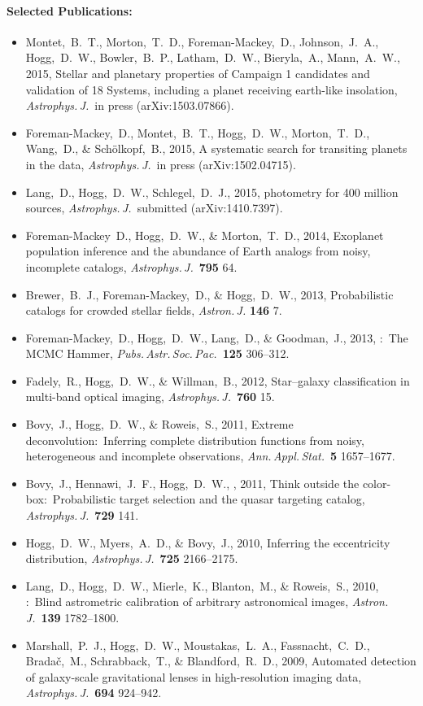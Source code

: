 \documentclass[12pt]{article}
\begin{document}
\paragraph{Selected Publications:}
\begin{itemize}\setlength{\itemsep}{0pt}
\item
Montet,~B.~T., Morton,~T.~D., Foreman-Mackey,~D., Johnson,~J.~A.,
Hogg,~D.~W., Bowler,~B.~P., Latham,~D.~W., Bieryla,~A., Mann,~A.~W., 2015,
{Stellar and planetary properties of  Campaign 1
  candidates and validation of 18 Systems, including a planet
  receiving earth-like insolation},
\textit{Astrophys.\,J.}\ in press (arXiv:1503.07866).
\item
Foreman-Mackey,~D., Montet,~B.~T., Hogg,~D.~W., Morton,~T.~D., Wang,~D., \& Sch\"olkopf,~B., 2015,
{A systematic search for transiting planets in the  data},
\textit{Astrophys.\,J.}\ in press (arXiv:1502.04715).
\item
Lang,~D., Hogg,~D.~W., Schlegel,~D.~J., 2015,
{ photometry for 400 million  sources},
\textit{Astrophys.\,J.}\ submitted (arXiv:1410.7397).
\item
Foreman-Mackey~D., Hogg,~D.~W., \& Morton,~T.~D., 2014,
{Exoplanet population inference and the abundance of Earth analogs from noisy, incomplete catalogs},
\textit{Astrophys.\,J.}\ \textbf{795} 64.
\item
Brewer,~B.~J., Foreman-Mackey,~D., \& Hogg,~D.~W., 2013,
{Probabilistic catalogs for crowded stellar fields},
\textit{Astron.\,J.} \textbf{146} 7.
\item
Foreman-Mackey,~D., Hogg,~D.~W., Lang,~D., \& Goodman,~J., 2013,
{:\ The MCMC Hammer},
\textit{Pubs.\,Astr.\,Soc.\,Pac.}\ \textbf{125} 306--312.
\item
Fadely,~R., Hogg,~D.~W., \& Willman,~B., 2012,
{Star--galaxy classification in multi-band optical imaging},
\textit{Astrophys.\,J.}\ \textbf{760} 15.
\item
Bovy,~J., Hogg,~D.~W., \& Roweis,~S., 2011,
{Extreme deconvolution:\ Inferring complete distribution functions from noisy, heterogeneous and incomplete observations},
\textit{Ann.\,Appl.\,Stat.}\ \textbf{5} 1657--1677.
\item
Bovy,~J., Hennawi,~J.~F., Hogg,~D.~W., \etal, 2011,
{Think outside the color-box:\ Probabilistic target selection and the  quasar targeting catalog},
\textit{Astrophys.\,J.}\ \textbf{729} 141.
\item
Hogg,~D.~W., Myers,~A.~D., \& Bovy,~J., 2010,
{Inferring the eccentricity distribution},
\textit{Astrophys.\,J.}\ \textbf{725} 2166--2175.
\item
Lang,~D., Hogg,~D.~W., Mierle,~K., Blanton,~M., \& Roweis,~S., 2010,
{:\ Blind astrometric calibration of arbitrary astronomical images},
\textit{Astron.\,J.}\ \textbf{139} 1782--1800.
\item
Marshall,~P.~J., Hogg,~D.~W., Moustakas,~L.~A., Fassnacht,~C.~D.,
Brada\v{c},~M., Schrabback,~T., \& Blandford,~R.~D., 2009,
{Automated detection of galaxy-scale gravitational lenses in high-resolution imaging data},
\textit{Astrophys.\,J.}\ \textbf{694} 924--942.
\end{itemize}
\end{document}
